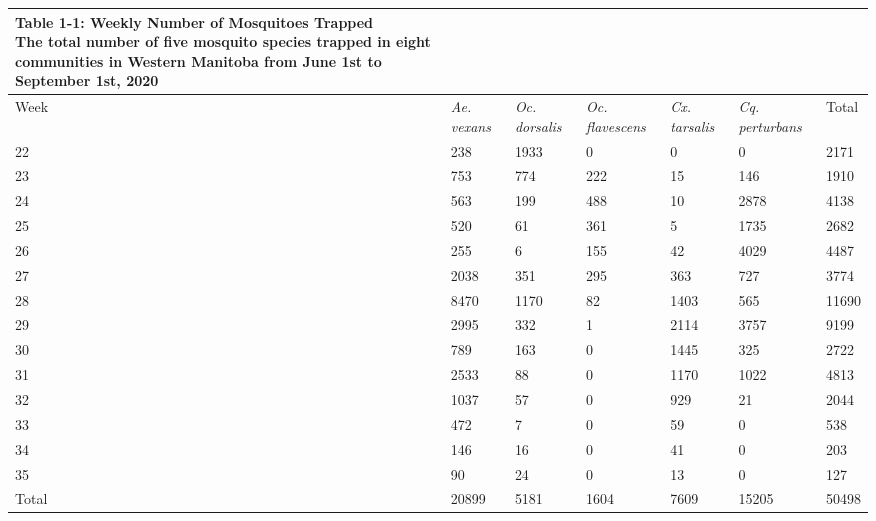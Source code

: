 \captionsetup[table]{labelformat=empty,skip=1pt}
\begin{longtable}{lllllll}
\caption*{
{\large \textbf{Table 1-1: Weekly Number of Mosquitoes Trapped}} \\ 
{\small The total number of five mosquito species trapped in eight
communities in Western Manitoba from June 1st to
September 1st, 2020}
} \\ 
\toprule
Week & \emph{Ae. vexans} & \emph{Oc. dorsalis} & \emph{Oc. flavescens} & \emph{Cx. tarsalis} & \emph{Cq. perturbans} & Total \\ 
\midrule
22 & 238 & 1933 & 0 & 0 & 0 & 2171 \\ 
23 & 753 & 774 & 222 & 15 & 146 & 1910 \\ 
24 & 563 & 199 & 488 & 10 & 2878 & 4138 \\ 
25 & 520 & 61 & 361 & 5 & 1735 & 2682 \\ 
26 & 255 & 6 & 155 & 42 & 4029 & 4487 \\ 
27 & 2038 & 351 & 295 & 363 & 727 & 3774 \\ 
28 & 8470 & 1170 & 82 & 1403 & 565 & 11690 \\ 
29 & 2995 & 332 & 1 & 2114 & 3757 & 9199 \\ 
30 & 789 & 163 & 0 & 1445 & 325 & 2722 \\ 
31 & 2533 & 88 & 0 & 1170 & 1022 & 4813 \\ 
32 & 1037 & 57 & 0 & 929 & 21 & 2044 \\ 
33 & 472 & 7 & 0 & 59 & 0 & 538 \\ 
34 & 146 & 16 & 0 & 41 & 0 & 203 \\ 
35 & 90 & 24 & 0 & 13 & 0 & 127 \\ 
Total & 20899 & 5181 & 1604 & 7609 & 15205 & 50498 \\ 
\bottomrule
\end{longtable}

